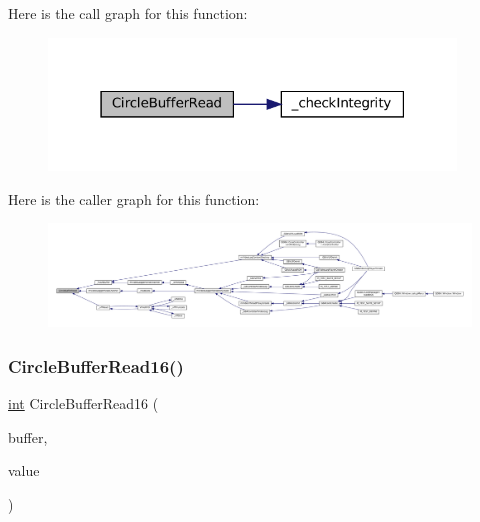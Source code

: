 Here is the call graph for this function\+:
\nopagebreak
\begin{figure}[H]
\begin{center}
\leavevmode
\includegraphics[width=307pt]{circle-buffer_8c_a1707584743172130e8ad7069926d985d_cgraph}
\end{center}
\end{figure}
Here is the caller graph for this function\+:
\nopagebreak
\begin{figure}[H]
\begin{center}
\leavevmode
\includegraphics[width=350pt]{circle-buffer_8c_a1707584743172130e8ad7069926d985d_icgraph}
\end{center}
\end{figure}
\mbox{\label{circle-buffer_8c_a6379e58465082beba80dc4da5885e39f}} 
\subsubsection{\texorpdfstring{Circle\+Buffer\+Read16()}{CircleBufferRead16()}}
{\footnotesize\ttfamily \mbox{\hyperlink{ioapi_8h_a787fa3cf048117ba7123753c1e74fcd6}{int}} Circle\+Buffer\+Read16 (\begin{DoxyParamCaption}\item[{struct Circle\+Buffer $\ast$}]{buffer,  }\item[{int16\+\_\+t $\ast$}]{value }\end{DoxyParamCaption})}

